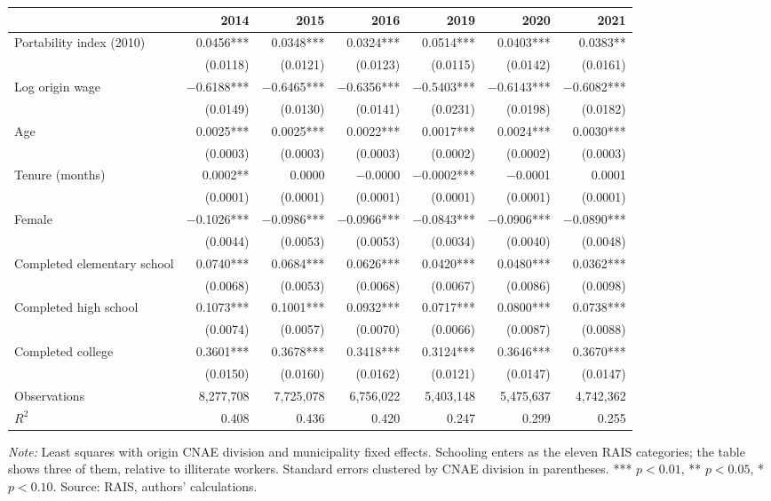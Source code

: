 {\footnotesize
\setlength{\tabcolsep}{3.5pt}
\begin{threeparttable}
\begin{tabular}{lrrrrrr}
\toprule
 & 2014 & 2015 & 2016 & 2019 & 2020 & 2021 \\
\midrule
Portability index (2010) & 0.0456*** & 0.0348*** & 0.0324*** & 0.0514*** & 0.0403*** & 0.0383** \\
 & (0.0118) & (0.0121) & (0.0123) & (0.0115) & (0.0142) & (0.0161) \\
Log origin wage & $-$0.6188*** & $-$0.6465*** & $-$0.6356*** & $-$0.5403*** & $-$0.6143*** & $-$0.6082*** \\
 & (0.0149) & (0.0130) & (0.0141) & (0.0231) & (0.0198) & (0.0182) \\
Age & 0.0025*** & 0.0025*** & 0.0022*** & 0.0017*** & 0.0024*** & 0.0030*** \\
 & (0.0003) & (0.0003) & (0.0003) & (0.0002) & (0.0002) & (0.0003) \\
Tenure (months) & 0.0002** & 0.0000 & $-$0.0000 & $-$0.0002*** & $-$0.0001 & 0.0001 \\
 & (0.0001) & (0.0001) & (0.0001) & (0.0001) & (0.0001) & (0.0001) \\
Female & $-$0.1026*** & $-$0.0986*** & $-$0.0966*** & $-$0.0843*** & $-$0.0906*** & $-$0.0890*** \\
 & (0.0044) & (0.0053) & (0.0053) & (0.0034) & (0.0040) & (0.0048) \\
Completed elementary school & 0.0740*** & 0.0684*** & 0.0626*** & 0.0420*** & 0.0480*** & 0.0362*** \\
 & (0.0068) & (0.0053) & (0.0068) & (0.0067) & (0.0086) & (0.0098) \\
Completed high school & 0.1073*** & 0.1001*** & 0.0932*** & 0.0717*** & 0.0800*** & 0.0738*** \\
 & (0.0074) & (0.0057) & (0.0070) & (0.0066) & (0.0087) & (0.0088) \\
Completed college & 0.3601*** & 0.3678*** & 0.3418*** & 0.3124*** & 0.3646*** & 0.3670*** \\
 & (0.0150) & (0.0160) & (0.0162) & (0.0121) & (0.0147) & (0.0147) \\
\midrule
Observations & 8,277,708 & 7,725,078 & 6,756,022 & 5,403,148 & 5,475,637 & 4,742,362 \\
$R^2$ & 0.408 & 0.436 & 0.420 & 0.247 & 0.299 & 0.255 \\
\bottomrule
\end{tabular}
\begin{tablenotes}[flushleft]\footnotesize
\item \textit{Note:} Least squares with origin CNAE division and municipality fixed effects. Schooling enters as the eleven RAIS categories; the table shows three of them, relative to illiterate workers. Standard errors clustered by CNAE division in parentheses. *** $p<0.01$, ** $p<0.05$, * $p<0.10$. Source: RAIS, authors' calculations.
\end{tablenotes}
\end{threeparttable}
}

